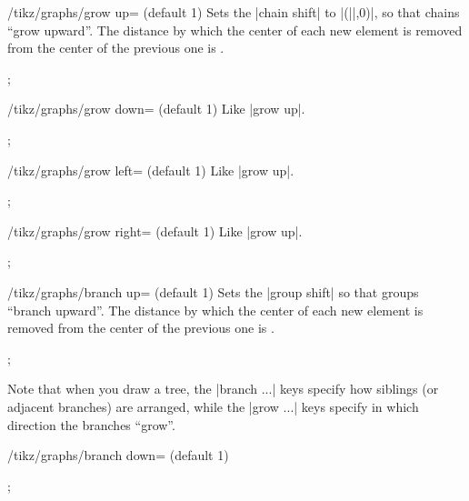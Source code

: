 \begin{key}{/tikz/graphs/grow up= (default 1)}
    Sets the |chain shift| to |(||,0)|, so that chains ``grow
    upward''. The distance by which the center of each new element is removed
    from the center of the previous one is .
\begin{codeexample}[]
\tikz {};
\end{codeexample}
\end{key}

\begin{key}{/tikz/graphs/grow down= (default 1)}
    Like |grow up|.
\begin{codeexample}[]
\tikz {};
\end{codeexample}
\end{key}

\begin{key}{/tikz/graphs/grow left= (default 1)}
    Like |grow up|.
\begin{codeexample}[]
\tikz {};
\end{codeexample}
\end{key}

\begin{key}{/tikz/graphs/grow right= (default 1)}
    Like |grow up|.
\begin{codeexample}[]
\tikz {};
\end{codeexample}
\end{key}

\begin{key}{/tikz/graphs/branch up= (default 1)}
    Sets the |group shift| so that groups ``branch upward''.  The distance by
    which the center of each new element is removed from the center of the
    previous one is .
\begin{codeexample}[]
\tikz {};
\end{codeexample}
    Note that when you draw a tree, the |branch ...| keys specify how siblings
    (or adjacent branches) are arranged, while the |grow ...| keys specify in
    which direction the branches ``grow''.
\end{key}

\begin{key}{/tikz/graphs/branch down= (default 1)}
%
\begin{codeexample}[]
\tikz {};
\end{codeexample}
%
\end{key}

